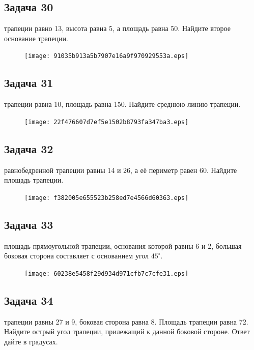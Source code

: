 \documentclass[a4paper,10pt]{article} %
\begin{document}
\begin{spacing}{1.0}
{\subsection*{Задача 30}
 трапеции равно 13, высота равна 5, а площадь равна 50. Найдите второе основание трапеции.

\vspace{1.5cm}

\begin{figure}{\texttt{[image: 91035b913a5b7907e16a9f970929553a.eps]}}\end{figure}
\subsection*{Задача 31}
 трапеции равна 10, площадь равна 150. Найдите среднюю линию трапеции. 

\begin{figure}{\texttt{[image: 22f476607d7ef5e1502b8793fa347ba3.eps]}}\end{figure}
\subsection*{Задача 32}
 равнобедренной трапеции равны 14 и 26, а её периметр равен 60. Найдите площадь трапеции. 

\vspace{1.5cm}

\begin{figure}{\texttt{[image: f382005e655523b258ed7e4566d60363.eps]}}\end{figure}
\subsection*{Задача 33}
 площадь прямоугольной трапеции, основания которой равны 6 и 2, большая боковая сторона составляет с основанием угол $45^\circ$.

\vspace{1.5cm}

\begin{figure}{\texttt{[image: 60238e5458f29d934d971cfb7c7cfe31.eps]}}\end{figure}
\subsection*{Задача 34}
 трапеции равны 27 и 9, боковая сторона равна 8. Площадь трапеции равна 72. Найдите острый угол трапеции, прилежащий к данной боковой стороне. Ответ дайте в градусах.

}
\end{spacing}
\end{document}
